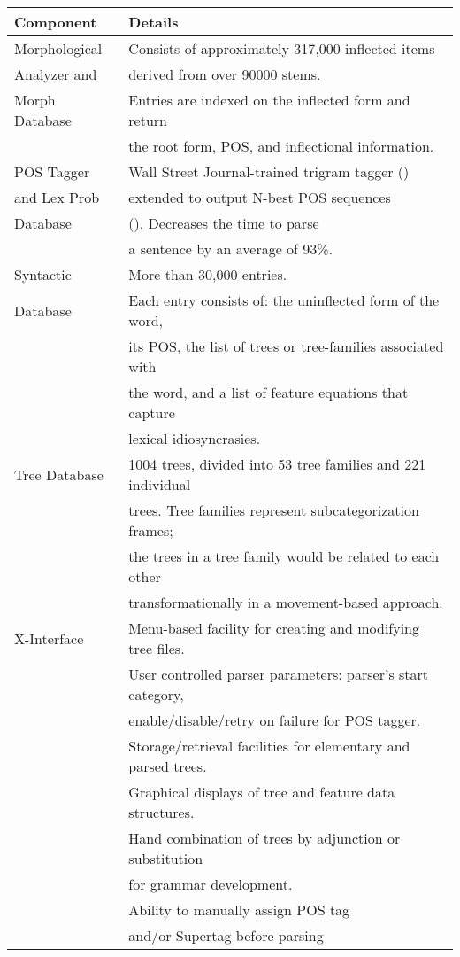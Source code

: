 \begin{table}[ht] 
\small 
\centering 
\begin{tabular}{|l|l|} \hline 
Component & Details \\ \hline 
Morphological & Consists of approximately 317,000 inflected items \\ 
Analyzer and & derived from over 90000 stems. \\ 
Morph Database & Entries are indexed on the inflected form and return \\ 
& the root form, POS, and inflectional information.\\ \hline 
POS Tagger & Wall Street Journal-trained 
trigram tagger (\cite{kwc88})  \\ 
and  Lex Prob & extended to output N-best POS sequences  \\ 
Database & (\cite{soong90}). Decreases the time to parse \\ 
&a sentence by an average of 93\%. \\\hline 
Syntactic &  More than 30,000 entries. \\ 
Database & Each entry consists of: the uninflected form of the word, \\ 
& its POS, the list of trees or tree-families associated with \\ 
& the word, and a list of feature equations that capture \\ 
&lexical idiosyncrasies. \\ \hline 
Tree Database &  1004 trees, divided into 53 tree families and 221 individual \\ 
& trees. Tree families represent subcategorization frames; \\ 
& the trees in a tree family would be related to each other \\ 
 
& transformationally in a movement-based approach. \\ \hline 
X-Interface & Menu-based facility for creating and modifying tree files. \\ 
&  User controlled parser parameters: parser's start category, \\ 
& enable/disable/retry on failure for POS tagger. \\ 
& Storage/retrieval facilities for elementary and parsed trees.\\ 
& Graphical displays of tree and feature data structures. \\ 
& Hand combination of trees by adjunction or substitution \\ 
& for grammar development. \\ 
& Ability to manually assign POS tag \\ 
& and/or Supertag before parsing \\ \hline 
\end{tabular} 
\begin{rawhtml} <dl> <dt>{System Summary <p> </dl> \end{rawhtml}
\label{sys-table} 
\end{table} 
 
